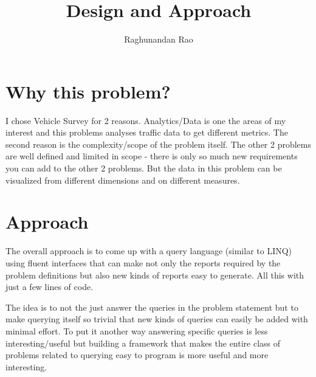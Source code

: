 \documentclass[a4paper]{article}
\begin{document}
 
\title{Design and Approach} 
\author{Raghunandan Rao}  
\maketitle

 
\section{Why this problem?}

I chose Vehicle Survey for 2 reasons. Analytics/Data is one the areas of my interest and this problems analyses traffic data to get different metrics. The second reason is the complexity/scope of the problem itself. The other 2 problems are well defined and limited in scope - there is only so much new requirements you can add to the other 2 problems. But the data in this problem can be visualized from different dimensions and on different measures.   
 
\section{Approach}

The overall approach is to come up with a query language (similar to LINQ) using fluent interfaces that can make not only the reports required by the problem definitions but also new kinds of reports easy to generate. All this with just a few lines of code.

The idea is to not the just answer the queries in the problem statement but to make querying itself so trivial that new kinds of queries can easily be added with minimal effort. To put it another way answering specific queries is less interesting/useful but building a framework that makes the entire class of problems related to querying easy to program is more useful and more interesting.  
\end{document}
